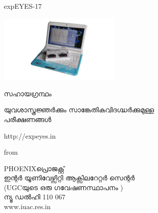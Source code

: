 \documentclass[12pt,a4paper]{report}
\begin{document}
\begin{titlepage}
\thispagestyle{empty}

\vspace{0.2in}

\begin{center}
{\Huge{}expEYES-17}
\par\end{center}{\Huge \par}

\begin{center}
\includegraphics[width=6cm]{../../pics/eyes17-nb}
\par\end{center}

\begin{center}
{\large{}സഹായഗ്രന്ഥം  }
\par\end{center}{\large \par}

\begin{center}
{\LARGE{} യുവശാസ്ത്രജ്ഞർക്കും സാങ്കേതികവിദഗ്ദ്ധർക്കുമുള്ള}\\
{\LARGE{}  പരീക്ഷണങ്ങൾ }
\par\end{center}{\LARGE \par}

\begin{center}
http://expeyes.in
\par\end{center}

\begin{center}
from
\par\end{center}

\begin{center}
PHOENIXപ്രൊജക്റ്റ് \\
ഇന്റർ യൂണിവേഴ്സിറ്റി ആക്സിലറേറ്റർ സെന്റർ  \\
(UGCയുടെ ഒരു ഗവേഷണസ്ഥാപനം )\\
ന്യൂ ഡൽഹി  110 067\\
www.iuac.res.in
\par\end{center}

\end{titlepage}
\end{document}

